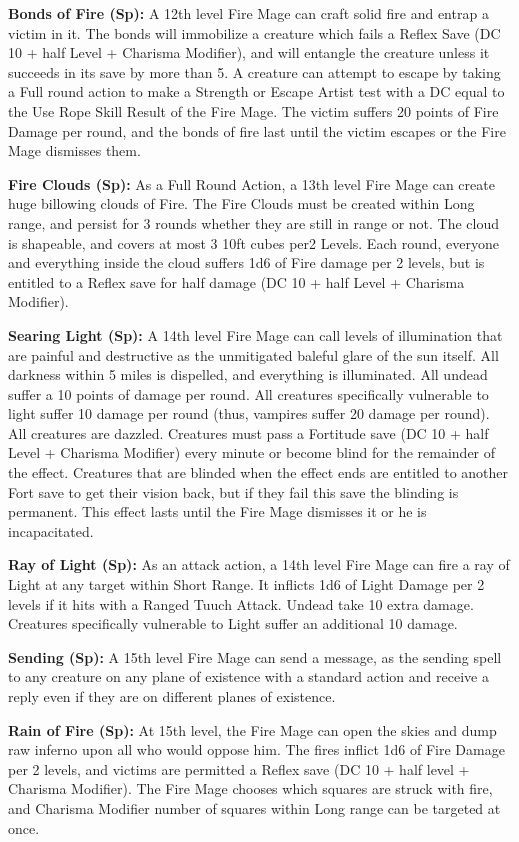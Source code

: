 \textbf{Bonds of Fire (Sp):} A 12th level Fire Mage can craft solid fire and entrap a victim in it. The bonds will immobilize a creature which fails a Reflex Save (DC 10 + half Level + Charisma Modifier), and will entangle the creature unless it succeeds in its save by more than 5. A creature can attempt to escape by taking a Full round action to make a Strength or Escape Artist test with a DC equal to the Use Rope Skill Result of the Fire Mage. The victim suffers 20 points of Fire Damage per round, and the bonds of fire last until the victim escapes or the Fire Mage dismisses them.

\textbf{Fire Clouds (Sp):} As a Full Round Action, a 13th level Fire Mage can create huge billowing clouds of Fire. The Fire Clouds must be created within Long range, and persist for 3 rounds whether they are still in range or not. The cloud is shapeable, and covers at most 3 10ft cubes per2  Levels. Each round, everyone and everything inside the cloud suffers 1d6 of Fire damage per 2 levels, but is entitled to a Reflex save for half damage (DC 10 + half Level + Charisma Modifier).

\textbf{Searing Light (Sp):} A 14th level Fire Mage can call levels of illumination that are painful and destructive as the unmitigated baleful glare of the sun itself. All darkness within 5 miles is dispelled, and everything is illuminated. All undead suffer a 10 points of damage per round. All creatures specifically vulnerable to light suffer 10 damage per round (thus, vampires suffer 20 damage per round). All creatures are dazzled. Creatures must pass a Fortitude save (DC 10 + half Level + Charisma Modifier) every minute or become blind for the remainder of the effect. Creatures that are blinded when the effect ends are entitled to another Fort save to get their vision back, but if they fail this save the blinding is permanent. This effect lasts until the Fire Mage dismisses it or he is incapacitated.

\textbf{Ray of Light (Sp):} As an attack action, a 14th level Fire Mage can fire a ray of Light at any target within Short Range. It inflicts 1d6 of Light Damage per 2 levels if it hits with a Ranged Tuuch Attack. Undead take 10 extra damage. Creatures specifically vulnerable to Light suffer an additional 10 damage.

\textbf{Sending (Sp):} A 15th level Fire Mage can send a message, as the sending spell to any creature on any plane of existence with a standard action and receive a reply even if they are on different planes of existence.

\textbf{Rain of Fire (Sp):} At 15th level, the Fire Mage can open the skies and dump raw inferno upon all who would oppose him. The fires inflict 1d6 of Fire Damage per 2 levels, and victims are permitted a Reflex save (DC 10 + half level + Charisma Modifier). The Fire Mage chooses which squares are struck with fire, and Charisma Modifier number of squares within Long range can be targeted at once.

